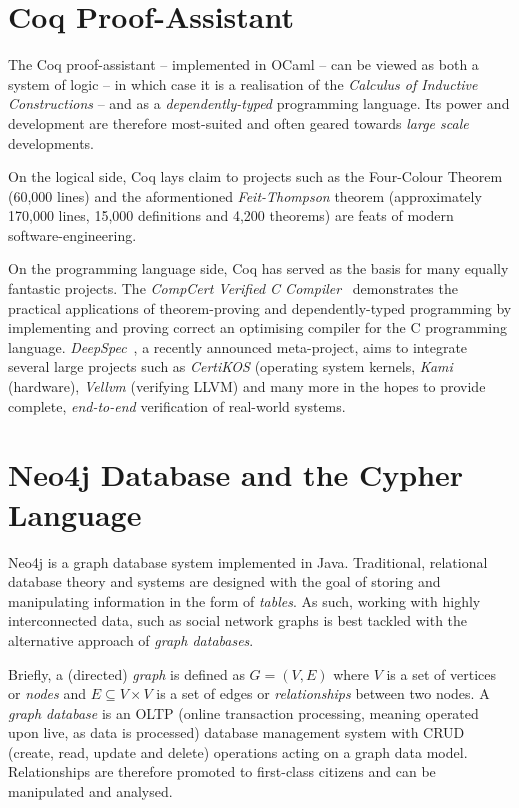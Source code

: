 \section{Coq Proof-Assistant}

The Coq proof-assistant -- implemented in OCaml -- can be viewed as both 
a system of logic -- in which case it is a realisation of the \emph{Calculus of
Inductive Constructions} -- and as a \emph{dependently-typed} programming
language. Its power and development are therefore most-suited and often geared
towards \emph{large scale} developments.

On the logical side, Coq lays claim to projects such as the Four-Colour
Theorem~\cite{gonthier2008formal} (60,000 lines) and the aformentioned
\emph{Feit-Thompson} theorem (approximately 170,000 lines, 15,000
definitions and 4,200 theorems) are feats of modern software-engineering.

On the programming language side, Coq has served as the basis for many equally
fantastic projects. The \emph{CompCert Verified C
Compiler}~\cite{leroy2012compcert} demonstrates the practical applications of
theorem-proving and dependently-typed programming by implementing and proving
correct an optimising compiler for the C programming language.
\emph{DeepSpec}~\cite{pierce2016science}, a recently announced meta-project,
aims to integrate several large projects such as \emph{CertiKOS} (operating
system kernels, \emph{Kami} (hardware), \emph{Vellvm} (verifying LLVM) and many
more in the hopes to provide complete, \emph{end-to-end} verification of
real-world systems.

\section{Neo4j Database and the Cypher Language}

Neo4j is a graph database system implemented in Java. Traditional, relational
database theory and systems are designed with the goal of storing and
manipulating information in the form of \emph{tables}. As such, working with
highly interconnected data, such as social network graphs is best tackled with
the alternative approach of \emph{graph databases}.

Briefly, a (directed) \emph{graph} is defined as $G = (V, E)$ where $V$ is a set
of vertices or \emph{nodes} and $E \subseteq V \times V$ is a set of edges or
\emph{relationships} between two nodes. A \emph{graph database} is an OLTP
(online transaction processing, meaning operated upon live, as data is
processed) database management system with CRUD (create, read, update and delete)
operations acting on a graph data model. Relationships are therefore promoted to
first-class citizens and can be manipulated and analysed.

